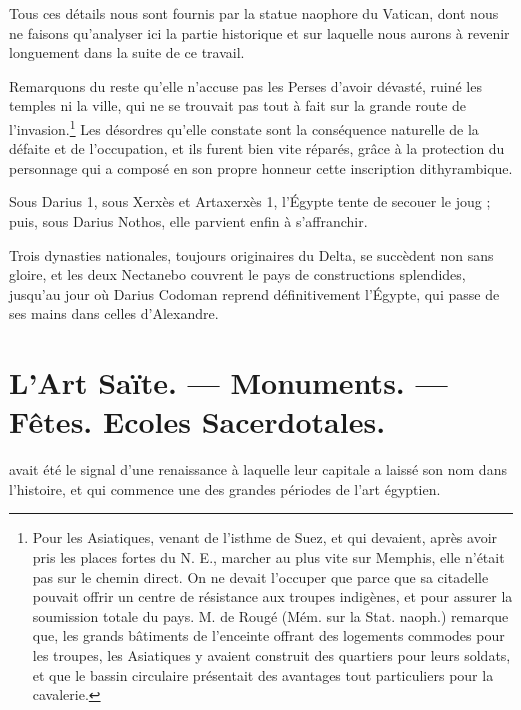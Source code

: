 \documentclass[letterpaper,twocolumn,openany,nodeprecatedcode]{dndbook}
\begin{document}
Tous ces détails nous sont fournis par la statue naophore du Vatican, dont nous ne faisons qu'analyser ici la partie historique et sur laquelle nous aurons à revenir longuement dans la suite de ce travail.

Remarquons du reste qu'elle n'accuse pas les Perses d'avoir dévasté, ruiné les temples ni la ville, qui ne se trouvait pas tout à fait sur la grande route de l'invasion.\footnote{Pour les Asiatiques, venant de l'isthme de Suez, et qui devaient, après avoir pris les places fortes du N. E., marcher au plus vite sur Memphis, elle n'était pas sur le chemin direct. On ne devait l'occuper que parce que sa citadelle pouvait offrir un centre de résistance aux troupes indigènes, et pour assurer la soumission totale du pays. M. de Rougé (Mém. sur la Stat. naoph.) remarque que, les grands bâtiments de l'enceinte offrant des logements commodes pour les troupes, les Asiatiques y avaient construit des quartiers pour leurs soldats, et que le bassin circulaire présentait des avantages tout particuliers pour la cavalerie.} Les désordres qu'elle constate sont la conséquence naturelle de la défaite et de l'occupation, et ils furent bien vite réparés, grâce à la protection du personnage qui a composé en son propre honneur cette inscription dithyrambique.

Sous Darius 1, sous Xerxès et Artaxerxès 1, l'Égypte tente de secouer le joug ; puis, sous Darius Nothos, elle parvient enfin à s'affranchir.

Trois dynasties nationales, toujours originaires du Delta, se succèdent non sans gloire, et les deux Nectanebo couvrent le pays de constructions splendides, jusqu'au jour où Darius Codoman reprend définitivement l'Égypte, qui passe de ses mains dans celles d'Alexandre.
\clearpage
\chapter{L'Art Saïte. --- Monuments. --- Fêtes. Ecoles Sacerdotales.}
 avait été le signal d'une renaissance à laquelle leur capitale a laissé son nom dans l'histoire, et qui commence une des grandes périodes de l'art égyptien.
\end{document}

